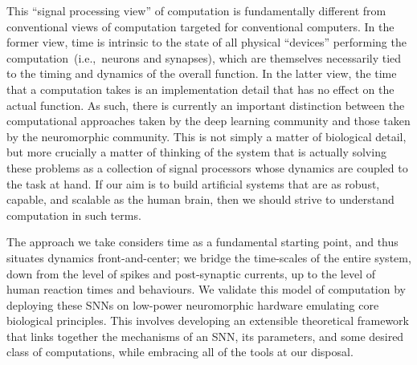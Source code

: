 This ``signal processing view'' of computation is fundamentally different from conventional views of computation targeted for conventional computers.
In the former view, time is intrinsic to the state of all physical ``devices'' performing the computation~(i.e.,~neurons and synapses), which are themselves necessarily tied to the timing and dynamics of the overall function.
In the latter view, the time that a computation takes is an implementation detail that has no effect on the actual function.
As such, there is currently an important distinction between the computational approaches taken by the deep learning community and those taken by the neuromorphic community.
This is not simply a matter of biological detail, but more crucially a matter of thinking of the system that is actually solving these problems as a collection of signal processors whose dynamics are coupled to the task at hand.
If our aim is to build artificial systems that are as robust, capable, and scalable as the human brain, then we should strive to understand computation in such terms.

The approach we take considers time as a fundamental starting point, and thus situates dynamics front-and-center; we bridge the time-scales of the entire system, down from the level of spikes and post-synaptic currents, up to the level of human reaction times and behaviours. 
We validate this model of computation by deploying these SNNs on low-power neuromorphic hardware emulating core biological principles.
This involves developing an extensible theoretical framework that links together the mechanisms of an SNN, its parameters, and some desired class of computations, while embracing all of the tools at our disposal.


